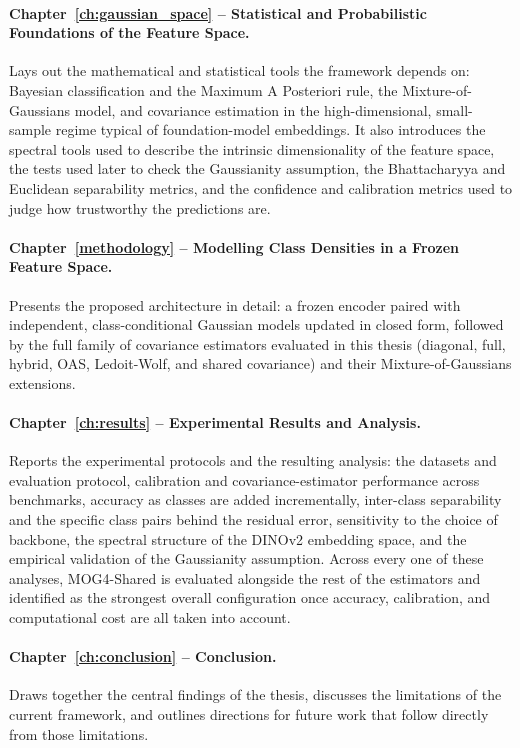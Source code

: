 \paragraph{Chapter~\ref{ch:gaussian_space} -- Statistical and Probabilistic Foundations of the Feature Space.} Lays out the mathematical and statistical tools the framework depends on: Bayesian classification and the Maximum A Posteriori rule, the Mixture-of-Gaussians model, and covariance estimation in the high-dimensional, small-sample regime typical of foundation-model embeddings. It also introduces the spectral tools used to describe the intrinsic dimensionality of the feature space, the tests used later to check the Gaussianity assumption, the Bhattacharyya and Euclidean separability metrics, and the confidence and calibration metrics used to judge how trustworthy the predictions are.

\paragraph{Chapter~\ref{methodology} -- Modelling Class Densities in a Frozen Feature Space.} Presents the proposed architecture in detail: a frozen encoder paired with independent, class-conditional Gaussian models updated in closed form, followed by the full family of covariance estimators evaluated in this thesis (diagonal, full, hybrid, OAS, Ledoit-Wolf, and shared covariance) and their Mixture-of-Gaussians extensions.

\paragraph{Chapter~\ref{ch:results} -- Experimental Results and Analysis.} Reports the experimental protocols and the resulting analysis: the datasets and evaluation protocol, calibration and covariance-estimator performance across benchmarks, accuracy as classes are added incrementally, inter-class separability and the specific class pairs behind the residual error, sensitivity to the choice of backbone, the spectral structure of the DINOv2 embedding space, and the empirical validation of the Gaussianity assumption. Across every one of these analyses, MOG4-Shared is evaluated alongside the rest of the estimators and identified as the strongest overall configuration once accuracy, calibration, and computational cost are all taken into account.

\paragraph{Chapter~\ref{ch:conclusion} -- Conclusion.} Draws together the central findings of the thesis, discusses the limitations of the current framework, and outlines directions for future work that follow directly from those limitations.
